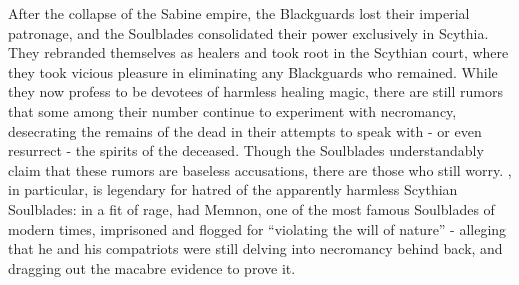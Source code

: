 \documentclass[blue]{Kos}
\begin{document}
After the collapse of the Sabine empire, the Blackguards lost their imperial patronage, and the Soulblades consolidated their power exclusively in Scythia. They rebranded themselves as healers and took root in the Scythian court, where they took vicious pleasure in eliminating any Blackguards who remained. While they now profess to be devotees of harmless healing magic, there are still rumors that some among their number continue to experiment with necromancy, desecrating the remains of the dead in their attempts to speak with - or even resurrect - the spirits of the deceased. Though the Soulblades understandably claim that these rumors are baseless accusations, there are those who still worry. \cScythiaQueen{\Monarch} \cScythiaQueen{}, in particular, is legendary for \cScythiaQueen{\their} hatred of the apparently harmless Scythian Soulblades: in a fit of rage, \cScythiaQueen{\they} had Memnon, one of the most famous Soulblades of modern times, imprisoned and flogged for ``violating the will of nature'' - alleging that he and his compatriots were still delving into necromancy behind \cScythiaQueen{\their} back, and dragging out the macabre evidence to prove it.
\end{document}
